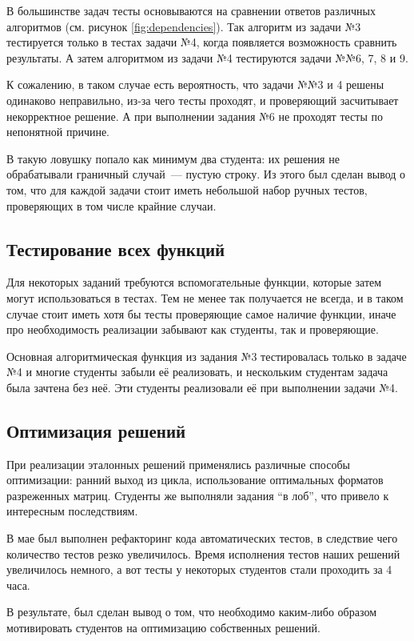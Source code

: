В большинстве задач тесты основываются на сравнении ответов различных алгоритмов (см. рисунок \ref{fig:dependencies}).
Так алгоритм из задачи №3 тестируется только в тестах задачи №4, когда появляется возможность сравнить результаты.
А затем алгоритмом из задачи №4 тестируются задачи №№6, 7, 8 и 9.

К сожалению, в таком случае есть вероятность, что задачи №№3 и 4 решены одинаково неправильно, из-за чего тесты проходят, и проверяющий засчитывает некорректное решение.
А при выполнении задания №6 не проходят тесты по непонятной причине.

В такую ловушку попало как минимум два студента: их решения не обрабатывали граничный случай~--- пустую строку.
Из этого был сделан вывод о том, что для каждой задачи стоит иметь небольшой набор ручных тестов, проверяющих в том числе крайние случаи.

\subsection{Тестирование всех функций}

Для некоторых заданий требуются вспомогательные функции, которые затем могут использоваться в тестах.
Тем не менее так получается не всегда, и в таком случае стоит иметь хотя бы тесты проверяющие самое наличие функции, иначе про необходимость реализации забывают как студенты, так и проверяющие.

Основная алгоритмическая функция из задания №3 тестировалась только в задаче №4 и многие студенты забыли её реализовать, и нескольким студентам задача была зачтена без неё.
Эти студенты реализовали её при выполнении задачи №4.

\subsection{Оптимизация решений}

При реализации эталонных решений применялись различные способы оптимизации: ранний выход из цикла, использование оптимальных форматов разреженных матриц.
Студенты же выполняли задания \enquote{в лоб}, что привело к интересным последствиям.

В мае был выполнен рефакторинг кода автоматических тестов, в следствие чего количество тестов резко увеличилось.
Время исполнения тестов наших решений увеличилось немного, а вот тесты у некоторых студентов стали проходить за 4 часа.

В результате, был сделан вывод о том, что необходимо каким-либо образом мотивировать студентов на оптимизацию собственных решений.
